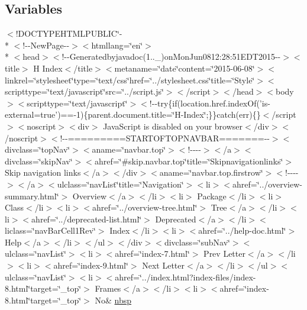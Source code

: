 \subsection*{Variables}
\begin{DoxyCompactItemize}
\item 
$<$!D\-O\-C\-T\-Y\-P\-E\-H\-T\-M\-L\-P\-U\-B\-L\-I\-C\char`\"{}-\/\\*
$<$!-\/-\/New\-Page-\/-\/$>$$<$htmllang=\char`\"{}en\char`\"{}$>$\\*
$<$head$>$$<$!-\/-\/Generatedbyjavadoc(1..\-\_)on\-Mon\-Jun0812\-:28\-:51\-E\-D\-T2015-\/-\/$>$$<$title$>$ H Index$<$/title$>$$<$metaname=\char`\"{}date\char`\"{}content=\char`\"{}2015-\/06-\/08\char`\"{}$>$$<$linkrel=\char`\"{}stylesheet\char`\"{}type=\char`\"{}text/css\char`\"{}href=\char`\"{}../stylesheet.\-css\char`\"{}title=\char`\"{}\-Style\char`\"{}$>$$<$scripttype=\char`\"{}text/javascript\char`\"{}src=\char`\"{}../script.\-js\char`\"{}$>$$<$/script$>$$<$/head$>$$<$body$>$$<$scripttype=\char`\"{}text/javascript\char`\"{}$>$$<$!-\/-\/try\{if(location.\-href.\-index\-Of('is-\/external=true')==-\/1)\{parent.\-document.\-title=\char`\"{}\-H-\/\-Index\char`\"{};\}\}catch(err)\{\}$<$/script$>$$<$noscript$>$$<$div$>$ Java\-Script is disabled on your browser$<$/div$>$$<$/noscript$>$$<$!-\/-\/=========\-S\-T\-A\-R\-T\-O\-F\-T\-O\-P\-N\-A\-V\-B\-A\-R=======-\/-\/$>$$<$divclass=\char`\"{}top\-Nav\char`\"{}$>$$<$aname=\char`\"{}navbar.\-top\char`\"{}$>$$<$!-\/-\/-\/-\/$>$$<$/a$>$$<$divclass=\char`\"{}skip\-Nav\char`\"{}$>$$<$ahref=\char`\"{}\#skip.\-navbar.\-top\char`\"{}title=\char`\"{}\-Skipnavigationlinks\char`\"{}$>$ Skip navigation links$<$/a$>$$<$/div$>$$<$aname=\char`\"{}navbar.\-top.\-firstrow\char`\"{}$>$$<$!-\/-\/-\/-\/$>$$<$/a$>$$<$ulclass=\char`\"{}nav\-List\char`\"{}title=\char`\"{}\-Navigation\char`\"{}$>$$<$li$>$$<$ahref=\char`\"{}../overview-\/summary.\-html\char`\"{}$>$ Overview$<$/a$>$$<$/li$>$$<$li$>$ Package$<$/li$>$$<$li$>$ Class$<$/li$>$$<$li$>$$<$ahref=\char`\"{}../overview-\/tree.\-html\char`\"{}$>$ Tree$<$/a$>$$<$/li$>$$<$li$>$$<$ahref=\char`\"{}../deprecated-\/list.\-html\char`\"{}$>$ Deprecated$<$/a$>$$<$/li$>$$<$liclass=\char`\"{}nav\-Bar\-Cell1\-Rev\char`\"{}$>$ Index$<$/li$>$$<$li$>$$<$ahref=\char`\"{}../help-\/doc.\-html\char`\"{}$>$ Help$<$/a$>$$<$/li$>$$<$/ul$>$$<$/div$>$$<$divclass=\char`\"{}sub\-Nav\char`\"{}$>$$<$ulclass=\char`\"{}nav\-List\char`\"{}$>$$<$li$>$$<$ahref=\char`\"{}index-\/7.\-html\char`\"{}$>$ Prev Letter$<$/a$>$$<$/li$>$$<$li$>$$<$ahref=\char`\"{}index-\/9.\-html\char`\"{}$>$ Next Letter$<$/a$>$$<$/li$>$$<$/ul$>$$<$ulclass=\char`\"{}nav\-List\char`\"{}$>$$<$li$>$$<$ahref=\char`\"{}../index.\-html?index-\/files/index-\/8.\-html\char`\"{}target=\char`\"{}\-\_\-top\char`\"{}$>$ Frames$<$/a$>$$<$/li$>$$<$li$>$$<$ahref=\char`\"{}index-\/8.\-html\char`\"{}target=\char`\"{}\-\_\-top\char`\"{}$>$ No\& \hyperlink{index-8_8html_a479d00f21dbca369efe3be97f1ef785a}{nbsp}
\end{DoxyCompactItemize}


